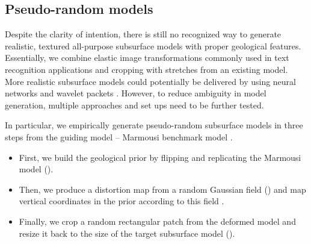 \documentclass[paper,twocolomn]{geophysics}
\begin{document}
\subsection{Pseudo-random models}
Despite the clarity of intention, there is still no recognized way to generate realistic, textured all-purpose subsurface models with proper geological features.
%
Essentially, we combine elastic image transformations commonly used in text recognition applications \citep{simard2003best} and cropping with stretches \citep{sunLowFrequencyExtrapolation2018} from an existing model. More realistic subsurface models could potentially be delivered by using neural networks \citep{ovcharenko2019style} and wavelet packets \citep{kazei2019realistically}. However, to reduce ambiguity in model generation, multiple approaches and set ups need to be further tested.

%
In particular, we empirically generate pseudo-random subsurface models in three steps from the guiding model -- Marmousi benchmark model \citep{marmousi1991}.

\begin{itemize}
	\item First, we build the geological prior by flipping and replicating the Marmousi model ().
	
	\item Then, we produce a distortion map from a random Gaussian field () and map vertical coordinates in the prior according to this field .
	
	\item Finally, we crop a random rectangular patch from the deformed model and resize it back to the size of the target subsurface model ().
\end{itemize} 




\end{document}

